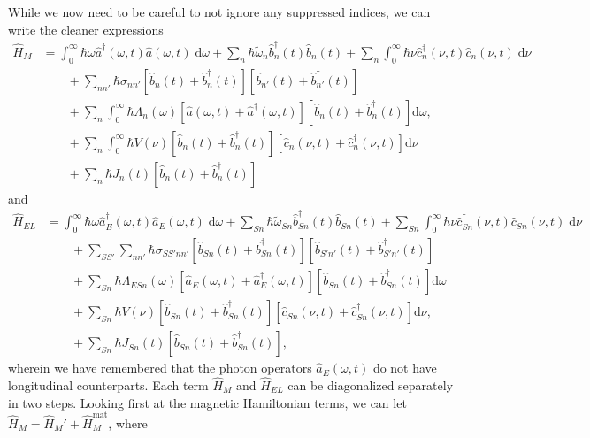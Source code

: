 \documentclass{article}
\begin{document}
While we now need to be careful to not ignore any suppressed indices, we can write the cleaner expressions
\begin{equation}
\begin{split}
\hat{H}_M &= \int_0^\infty\hbar\omega\hat{a}^\dagger(\omega,t)\hat{a}(\omega,t)\;\mathrm{d}\omega + \sum_n\hbar\tilde{\omega}_n\hat{b}_n^\dagger(t)\hat{b}_n(t) + \sum_n\int_0^\infty\hbar\nu\hat{c}_n^\dagger(\nu,t)\hat{c}_n(\nu,t)\;\mathrm{d}\nu\\
&\qquad + \sum_{nn'}\hbar\sigma_{nn'}\left[\hat{b}_n(t) + \hat{b}_n^\dagger(t)\right]\left[\hat{b}_{n'}(t) + \hat{b}_{n'}^\dagger(t)\right] \\
&\qquad + \sum_n\int_0^\infty\hbar\Lambda_n(\omega)\left[\hat{a}(\omega,t) + \hat{a}^\dagger(\omega,t)\right]\left[\hat{b}_n(t) + \hat{b}_n^\dagger(t)\right]\mathrm{d}\omega,\\
&\qquad + \sum_n\int_0^\infty\hbar V(\nu)\left[\hat{b}_n(t) + \hat{b}_n^\dagger(t)\right]\left[\hat{c}_n(\nu,t) + \hat{c}_n^\dagger(\nu,t)\right]\mathrm{d}\nu\\
&\qquad + \sum_n\hbar J_n(t)\left[\hat{b}_n(t) + \hat{b}_n^\dagger(t)\right]
\end{split}
\end{equation}
and
\begin{equation}
\begin{split}
\hat{H}_{EL} &= \int_0^\infty\hbar\omega\hat{a}_E^\dagger(\omega,t)\hat{a}_E(\omega,t)\;\mathrm{d}\omega + \sum_{Sn}\hbar\tilde{\omega}_{Sn}\hat{b}_{Sn}^\dagger(t)\hat{b}_{Sn}(t) + \sum_{Sn}\int_0^\infty\hbar\nu\hat{c}_{Sn}^\dagger(\nu,t)\hat{c}_{Sn}(\nu,t)\;\mathrm{d}\nu\\
&\qquad + \sum_{SS'}\sum_{nn'}\hbar\sigma_{SS'nn'}\left[\hat{b}_{Sn}(t) + \hat{b}_{Sn}^\dagger(t)\right]\left[\hat{b}_{S'n'}(t) + \hat{b}_{S'n'}^\dagger(t)\right]\\
&\qquad + \sum_{Sn}\hbar\Lambda_{ESn}(\omega)\left[\hat{a}_{E}(\omega,t) + \hat{a}_{E}^\dagger(\omega,t)\right]\left[\hat{b}_{Sn}(t) + \hat{b}_{Sn}^\dagger(t)\right]\mathrm{d}\omega\\
&\qquad + \sum_{Sn}\hbar V(\nu)\left[\hat{b}_{Sn}(t) + \hat{b}_{Sn}^\dagger(t)\right]\left[\hat{c}_{Sn}(\nu,t) + \hat{c}_{Sn}^\dagger(\nu,t)\right]\mathrm{d}\nu,\\
&\qquad + \sum_{Sn}\hbar J_{Sn}(t)\left[\hat{b}_{Sn}(t) + \hat{b}_{Sn}^\dagger(t)\right],
\end{split}
\end{equation}
wherein we have remembered that the photon operators $\hat{a}_E(\omega,t)$ do not have longitudinal counterparts. Each term $\hat{H}_M$ and $\hat{H}_{EL}$ can be diagonalized separately in two steps. Looking first at the magnetic Hamiltonian terms, we can let $\hat{H}_M = \hat{H}_M' + \hat{H}_M^\mathrm{mat}$, where
\end{document}
